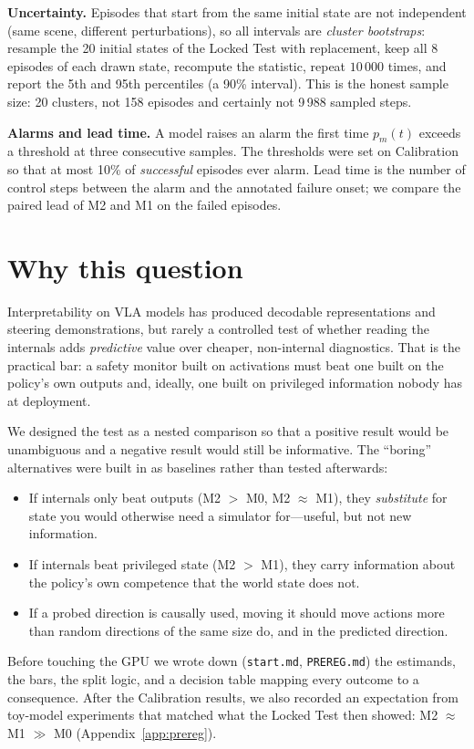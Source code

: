 \documentclass[11pt,a4paper]{article}
\newcommand{\Mz}{M0}\newcommand{\Mo}{M1}\newcommand{\Mt}{M2}
\begin{document}
\textbf{Uncertainty.} Episodes that start from the same initial state are not independent (same scene, different perturbations), so all intervals are \emph{cluster bootstraps}: resample the 20 initial states of the Locked Test with replacement, keep all 8 episodes of each drawn state, recompute the statistic, repeat $10\,000$ times, and report the 5th and 95th percentiles (a 90\% interval). This is the honest sample size: 20 clusters, not 158 episodes and certainly not 9\,988 sampled steps.

\textbf{Alarms and lead time.} A model raises an alarm the first time $p_m(t)$ exceeds a threshold at three consecutive samples. The thresholds were set on Calibration so that at most 10\% of \emph{successful} episodes ever alarm. Lead time is the number of control steps between the alarm and the annotated failure onset; we compare the paired lead of \Mt{} and \Mo{} on the failed episodes.

\section{Why this question}
\label{sec:why}
Interpretability on VLA models has produced decodable representations and steering demonstrations, but rarely a controlled test of whether reading the internals adds \emph{predictive} value over cheaper, non-internal diagnostics. That is the practical bar: a safety monitor built on activations must beat one built on the policy's own outputs and, ideally, one built on privileged information nobody has at deployment.

We designed the test as a nested comparison so that a positive result would be unambiguous and a negative result would still be informative. The ``boring'' alternatives were built in as baselines rather than tested afterwards:
\begin{itemize}
\item If internals only beat outputs (\Mt{} $>$ \Mz{}, \Mt{} $\approx$ \Mo{}), they \emph{substitute} for state you would otherwise need a simulator for---useful, but not new information.
\item If internals beat privileged state (\Mt{} $>$ \Mo{}), they carry information about the policy's own competence that the world state does not.
\item If a probed direction is causally used, moving it should move actions more than random directions of the same size do, and in the predicted direction.
\end{itemize}
Before touching the GPU we wrote down (\texttt{start.md}, \texttt{PREREG.md}) the estimands, the bars, the split logic, and a decision table mapping every outcome to a consequence. After the Calibration results, we also recorded an expectation from toy-model experiments that matched what the Locked Test then showed: \Mt{} $\approx$ \Mo{} $\gg$ \Mz{} (Appendix~\ref{app:prereg}).
\end{document}
